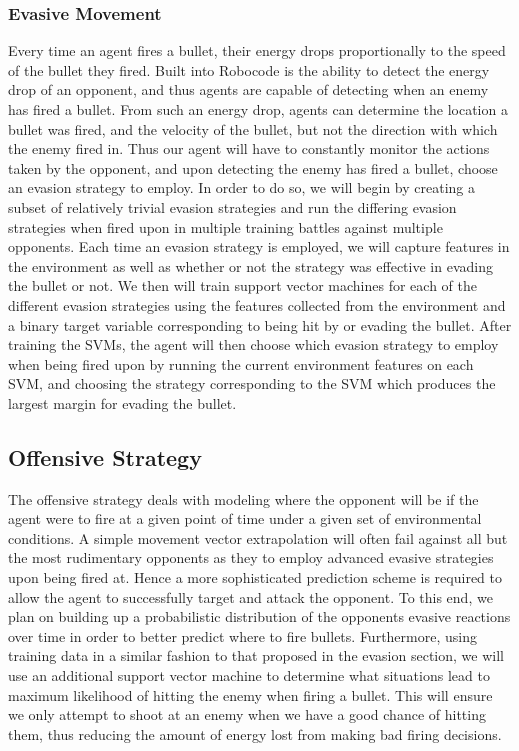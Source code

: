 \documentclass{article}
\theoremstyle{plain}
\theoremstyle{definition}
\theoremstyle{remark}
\begin{document}
\subsubsection*{Evasive Movement }
Every time an agent fires a bullet, their energy drops proportionally to the speed of the bullet they fired. Built into Robocode is the ability to detect the energy drop of an opponent, and thus agents are capable of detecting when an enemy has fired a bullet. From such an energy drop, agents can determine the location a bullet was fired, and the velocity of the bullet, but not the direction with which the enemy fired in. Thus our agent will have to constantly monitor the actions taken by the opponent, and upon detecting the enemy has fired a bullet, choose an evasion strategy to employ. In order to do so, we will begin by creating a subset of relatively trivial evasion strategies and run the differing evasion strategies when fired upon in multiple training battles against multiple opponents. Each time an evasion strategy is employed, we will capture features in the environment as well as whether or not the strategy was effective in evading the bullet or not. We then will train support vector machines for each of the different evasion strategies using the features collected from the environment and a binary target variable corresponding to being hit by or evading the bullet. After training the SVMs, the agent will then choose which evasion strategy to employ when being fired upon by running the current environment features on each SVM, and choosing the strategy corresponding to the SVM which produces the largest margin for evading the bullet. 

\subsection*{Offensive Strategy}
The offensive strategy deals with modeling where the opponent will be if the agent were to fire at a given point of time under a given set of environmental conditions. A simple movement vector extrapolation will often fail against all but the most rudimentary opponents as they to employ advanced evasive strategies upon being fired at. Hence a more sophisticated prediction scheme is required to allow the agent to successfully target and attack the opponent. To this end, we plan on building up a probabilistic distribution of the opponents evasive reactions over time in order to better predict where to fire bullets. Furthermore, using training data in a similar fashion to that proposed in the evasion section, we will use an additional support vector machine to determine what situations lead to maximum likelihood of hitting the enemy when firing a bullet. This will ensure we only attempt to shoot at an enemy when we have a good chance of hitting them, thus reducing the amount of energy lost from making bad firing decisions. 
 
\end{document}
